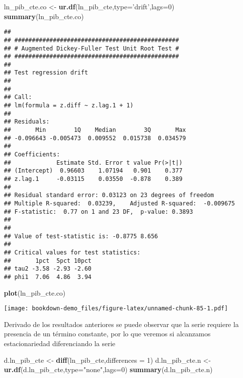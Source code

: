 \documentclass[]{book}
\newenvironment{Shaded}{\begin{snugshade}}{\end{snugshade}}
\newcommand{\KeywordTok}[1]{\textcolor[rgb]{0.13,0.29,0.53}{\textbf{#1}}}
\newcommand{\DataTypeTok}[1]{\textcolor[rgb]{0.13,0.29,0.53}{#1}}
\newcommand{\DecValTok}[1]{\textcolor[rgb]{0.00,0.00,0.81}{#1}}
\newcommand{\StringTok}[1]{\textcolor[rgb]{0.31,0.60,0.02}{#1}}
\newcommand{\NormalTok}[1]{#1}
\theoremstyle{definition}
\theoremstyle{definition}
\theoremstyle{definition}
\theoremstyle{remark}
\begin{document}
\begin{Shaded}
\begin{Highlighting}[]
\NormalTok{ln_pib_cte.co <-}\StringTok{ }\KeywordTok{ur.df}\NormalTok{(ln_pib_cte,}\DataTypeTok{type=}\StringTok{'drift'}\NormalTok{,}\DataTypeTok{lags=}\DecValTok{0}\NormalTok{)}
\KeywordTok{summary}\NormalTok{(ln_pib_cte.co)}
\end{Highlighting}
\end{Shaded}

\begin{verbatim}
## 
## ############################################### 
## # Augmented Dickey-Fuller Test Unit Root Test # 
## ############################################### 
## 
## Test regression drift 
## 
## 
## Call:
## lm(formula = z.diff ~ z.lag.1 + 1)
## 
## Residuals:
##       Min        1Q    Median        3Q       Max 
## -0.096643 -0.005473  0.009552  0.015738  0.034579 
## 
## Coefficients:
##             Estimate Std. Error t value Pr(>|t|)
## (Intercept)  0.96603    1.07194   0.901    0.377
## z.lag.1     -0.03115    0.03550  -0.878    0.389
## 
## Residual standard error: 0.03123 on 23 degrees of freedom
## Multiple R-squared:  0.03239,    Adjusted R-squared:  -0.009675 
## F-statistic:  0.77 on 1 and 23 DF,  p-value: 0.3893
## 
## 
## Value of test-statistic is: -0.8775 8.656 
## 
## Critical values for test statistics: 
##       1pct  5pct 10pct
## tau2 -3.58 -2.93 -2.60
## phi1  7.06  4.86  3.94
\end{verbatim}

\begin{Shaded}
\begin{Highlighting}[]
\KeywordTok{plot}\NormalTok{(ln_pib_cte.co)}
\end{Highlighting}
\end{Shaded}

\texttt{[image: bookdown-demo\_files/figure-latex/unnamed-chunk-85-1.pdf]}

Derivado de los resultados anteriores se puede observar que la serie
requiere la presencia de un término constante, por lo que veremos si
alcanzamos estacionariedad diferenciando la serie

\begin{Shaded}
\begin{Highlighting}[]
\NormalTok{d.ln_pib_cte <-}\StringTok{ }\KeywordTok{diff}\NormalTok{(ln_pib_cte,}\DataTypeTok{differences =} \DecValTok{1}\NormalTok{)}
\NormalTok{d.ln_pib_cte.n <-}\StringTok{ }\KeywordTok{ur.df}\NormalTok{(d.ln_pib_cte,}\DataTypeTok{type=}\StringTok{"none"}\NormalTok{,}\DataTypeTok{lags=}\DecValTok{0}\NormalTok{)}
\KeywordTok{summary}\NormalTok{(d.ln_pib_cte.n)}
\end{Highlighting}
\end{Shaded}
\end{document}
